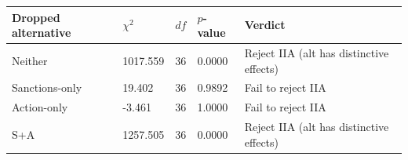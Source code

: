 
\begin{tabular}[t]{lllll}
\toprule
Dropped alternative & $\chi^{2}$ & $df$ & $p$-value & Verdict\\
\midrule
Neither & 1017.559 & 36 & 0.0000 & Reject IIA (alt has distinctive effects)\\
Sanctions-only & 19.402 & 36 & 0.9892 & Fail to reject IIA\\
Action-only & -3.461 & 36 & 1.0000 & Fail to reject IIA\\
S+A & 1257.505 & 36 & 0.0000 & Reject IIA (alt has distinctive effects)\\
\bottomrule
\end{tabular}
